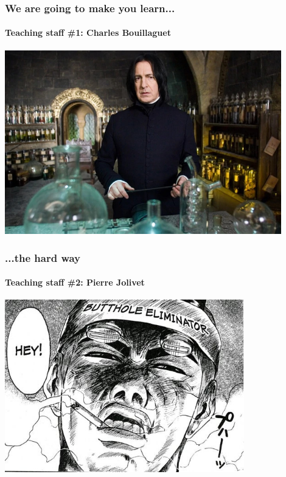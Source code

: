 \documentclass[10pt]{beamer}
\begin{document}
{
\begin{frame}
  \frametitle{\color{white} We are going to \textbf{make you} learn...}
  \framesubtitle{\color{white} Teaching staff \#1: Charles Bouillaguet}
  
  \centering
  \includegraphics[height=8cm]{severus.jpg}
\end{frame}
}


{
\begin{frame}
  \frametitle{\color{white} ...the \textbf{hard} way}
  \framesubtitle{\color{white} Teaching staff \#2: Pierre Jolivet}

  \centering
  \includegraphics[height=7.5cm]{gto.jpg}
\end{frame}
}

\end{document}

